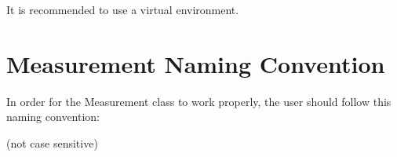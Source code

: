 \documentclass[letterpaper,10pt,english]{sphinxmanual}
\begin{document}
\begin{sphinxVerbatim}[commandchars=\\\{\}]
   
\end{sphinxVerbatim}

It is recommended to use a virtual environment.


\chapter{Measurement Naming Convention}
\label{\detokenize{naming-convention:measurement-naming-convention}}\label{\detokenize{naming-convention::doc}}
In order for the Measurement class to work properly, the user should follow this naming convention:

 (not case sensitive)
\end{document}
